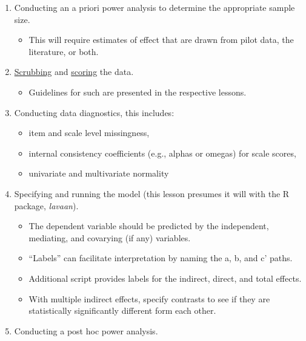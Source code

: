 \documentclass[
  11pt,
]{book}
\providecommand{\tightlist}{%
  \setlength{\itemsep}{0pt}\setlength{\parskip}{0pt}}
\begin{document}
\begin{enumerate}
\def\labelenumi{\arabic{enumi}.}
\tightlist
\item
  Conducting an a priori power analysis to determine the appropriate sample size.

  \begin{itemize}
  \tightlist
  \item
    This will require estimates of effect that are drawn from pilot data, the literature, or both.
  \end{itemize}
\item
  \href{https://lhbikos.github.io/ReC_MultivModel/scrub.html}{Scrubbing} and \href{https://lhbikos.github.io/ReC_MultivModel/score.html}{scoring} the data.

  \begin{itemize}
  \tightlist
  \item
    Guidelines for such are presented in the respective lessons.
  \end{itemize}
\item
  Conducting data diagnostics, this includes:

  \begin{itemize}
  \tightlist
  \item
    item and scale level missingness,
  \item
    internal consistency coefficients (e.g., alphas or omegas) for scale scores,
  \item
    univariate and multivariate normality
  \end{itemize}
\item
  Specifying and running the model (this lesson presumes it will with the R package, \emph{lavaan}).

  \begin{itemize}
  \tightlist
  \item
    The dependent variable should be predicted by the independent, mediating, and covarying (if any) variables.
  \item
    ``Labels'' can facilitate interpretation by naming the a, b, and c' paths.
  \item
    Additional script provides labels for the indirect, direct, and total effects.
  \item
    With multiple indirect effects, specify contrasts to see if they are statistically significantly different form each other.
  \end{itemize}
\item
  Conducting a post hoc power analysis.


\end{enumerate}
\end{document}

